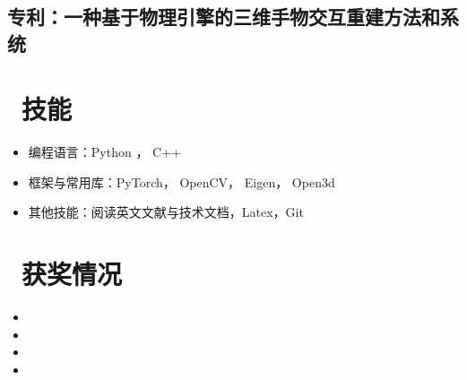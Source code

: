 \documentclass{resume}
\begin{document}
\subsection{\textbf{专利：一种基于物理引擎的三维手物交互重建方法和系统}}
\vspace{2mm}

\section{\faCogs\ 技能}
\begin{itemize} [parsep=0.5ex]
  \item 编程语言：Python ， C++
  \item 框架与常用库：PyTorch， OpenCV， Eigen， Open3d
  \item 其他技能：阅读英文文献与技术文档，Latex，Git
\end{itemize}

\section{\faTrophy\ 获奖情况}
\begin{itemize}
    \item{}
    \item{}
    \item{}
    \item {}
\end{itemize}
\end{document}
